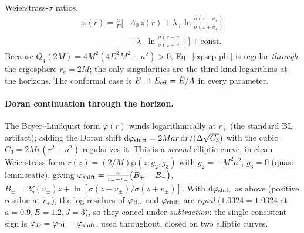 \documentclass[
    aps, prd, twocolumn, superscriptaddress,
    showpacs, nofootinbib, floatfix
]{revtex4-2}
\newcommand{\Ehat}{\hat E}
\newcommand{\rp}{r_{+}}
\newcommand{\re}{r_{e}}
\newcommand{\dd}{\mathrm{d}}
\begin{document}
Weierstrass-$\sigma$ ratios,
\begin{equation}
\begin{split}
    \varphi(r)=\frac{a}{E}\Big[&\Lambda_0\,z(r)
      +\lambda_+\ln\frac{\sigma(z-v_+)}{\sigma(z+v_+)}\\
      &+\lambda_-\ln\frac{\sigma(z-v_-)}{\sigma(z+v_-)}\Big]+\text{const}.
\end{split}
    \label{eq:sep-phi}
\end{equation}
Because $Q_4(2M)=4M^2(4E^2M^2+a^2)>0$, Eq.~\eqref{eq:sep-phi} is regular
\emph{through} the ergosphere $\re=2M$; the only singularities are the
third-kind logarithms at the horizons. The conformal case is
$E\to E_{\rm eff}=\Ehat/A$ in every parameter.

\paragraph{Doran continuation through the horizon.} The Boyer--Lindquist form
$\varphi(r)$ winds logarithmically at $\rp$ (the standard BL artifact); adding the
Doran shift $\dd\varphi_{\rm shift}=2Mar\,\dd r/(\Delta\sqrt{C_3})$ with the cubic
$C_3=2Mr(r^2+a^2)$ regularizes it. This is a \emph{second} elliptic curve, in
clean Weierstrass form $r(z)=(2/M)\wp(z;g_2,g_3)$ with $g_2=-M^2a^2$, $g_3=0$
(quasi-lemniscatic), giving
$\varphi_{\rm shift}=\tfrac{a}{r_+-r_-}\big(B_+-B_-\big)$,
$B_\pm=2\zeta(v_\pm)z+\ln[\sigma(z-v_\pm)/\sigma(z+v_\pm)]$. With $\dd\varphi_{\rm
shift}$ as above (positive residue at $\rp$), the log residues of $\varphi_{\rm BL}$
and $\varphi_{\rm shift}$ are \emph{equal} ($1.0324=1.0324$ at $a=0.9,E=1.2,J=3$),
so they cancel under \emph{subtraction}: the single consistent sign is
$\varphi_D=\varphi_{\rm BL}-\varphi_{\rm shift}$, used throughout, closed on two
elliptic curves.
\end{document}
